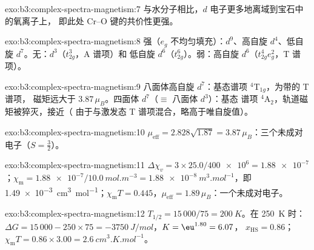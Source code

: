 \begin{solution}{exo:b3:complex-spectra-magnetism:7}
与水分子相比，$d$ 电子更多地离域到宝石中的氧离子上，
即此处 Cr--O 键的共价性更强。
\end{solution}

\begin{solution}{exo:b3:complex-spectra-magnetism:8}
强（$e_g$ 不均匀填充）：$d^9$、高自旋 $d^4$、低自旋 $d^7$。无：$d^3$（$t_{2g}^3$，A 谱项）和
低自旋 $d^6$（$t_{2g}^6$）。弱：高自旋 $d^6$（$t_{2g}^4e_g^2$，T 谱项）。
\end{solution}

\begin{solution}{exo:b3:complex-spectra-magnetism:9}
八面体高自旋 $d^7$：基态谱项 $^4$T$_{1g}$，为带的 T 谱项，
磁矩远大于 $3.87\,\mu_B$。四面体 $d^7$（$\equiv$ 八面体 $d^3$）：基态
谱项 $^4$A$_2$，轨道磁矩被猝灭，接近（
由于与激发态 T 谱项混合，略高于唯自旋值）。
\end{solution}

\begin{solution}{exo:b3:complex-spectra-magnetism:10}
$\mu_{\mathrm{eff}} = 2.828\sqrt{1.87} = 3.87\,\mu_B$：三个未成对电子（$S = \frac32$）。
\end{solution}

\begin{solution}{exo:b3:complex-spectra-magnetism:11}
$\Delta\chi_v = 3 \times 25.0/\num{400e6} = \num{1.88e-7}$；$\chi_{\mathrm m} = \num{1.88e-7}/\qty{10.0}{mol.m^{-3}} = \qty{1.88e-8}{m^3.mol^{-1}}$，即
\qty{1.49e-3}{cm^3.mol^{-1}}；$\chi_{\mathrm m}T = 0.445$，$\mu_{\mathrm{eff}} = 1.89\,\mu_B$：一个未成对电子。
\end{solution}

\begin{solution}{exo:b3:complex-spectra-magnetism:12}
$T_{1/2} = 15\,000/75 = \qty{200}{K}$。在 \qty{250}{K} 时：$\Delta G = 15\,000 - 250 \times 75 = \qty{-3750}{J/mol}$，$K = \eu^{1.80} = 6.07$，
$x_{\mathrm{HS}} = 0.86$；$\chi_{\mathrm m}T = 0.86 \times 3.00 = \qty{2.6}{cm^3.K.mol^{-1}}$。
\end{solution}

